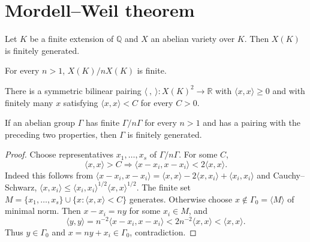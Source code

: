 \section{Mordell--Weil theorem}
\label{mumford-appendix-II-source}

\begin{theorem}\label{mumford-thm-mordell-weil}
Let $K$ be a finite extension of $\mathbb Q$ and $X$ an abelian variety over
$K$. Then $X(K)$ is finitely generated.
\end{theorem}
\begin{proposition}\label{mumford-prop-weak-mordell-weil}
\label{mumford-thm-weak-mordell-weil}
For every $n>1$, $X(K)/nX(K)$ is finite.
\end{proposition}
\begin{proposition}\label{mumford-prop-height-quadratic}
\label{mumford-prop-canonical-height}
There is a symmetric bilinear pairing $\langle\ ,\ \rangle:X(K)^2\to\mathbb R$
with $\langle x,x\rangle\ge0$ and with finitely many $x$ satisfying
$\langle x,x\rangle<C$ for every $C>0$.
\end{proposition}
\begin{proposition}\label{mumford-prop-formal-finite-generation}
\label{mumford-thm-mordell-weil-descent}
If an abelian group $\Gamma$ has finite $\Gamma/n\Gamma$ for every $n>1$ and
has a pairing with the preceding two properties, then $\Gamma$ is finitely generated.
\leanok
\end{proposition}
\begin{proof}
Choose representatives $x_1,\ldots,x_s$ of $\Gamma/n\Gamma$. For some $C$,
\[
\langle x,x\rangle>C\Rightarrow\langle x-x_i,x-x_i\rangle<2\langle x,x\rangle.\tag{1}
\]
Indeed this follows from
$\langle x-x_i,x-x_i\rangle=\langle x,x\rangle-2\langle x,x_i\rangle+\langle x_i,x_i\rangle$
and Cauchy--Schwarz,
$\langle x,x_i\rangle\le\langle x_i,x_i\rangle^{1/2}\langle x,x\rangle^{1/2}$.
The finite set
$M=\{x_1,\ldots,x_s\}\cup\{x:\langle x,x\rangle<C\}$ generates. Otherwise choose
$x\notin\Gamma_0=\langle M\rangle$ of minimal norm. Then $x-x_i=ny$ for some
$x_i\in M$, and
\[
\langle y,y\rangle=n^{-2}\langle x-x_i,x-x_i\rangle<2n^{-2}\langle x,x\rangle<\langle x,x\rangle.
\]
Thus $y\in\Gamma_0$ and $x=ny+x_i\in\Gamma_0$, contradiction.

\end{proof}

